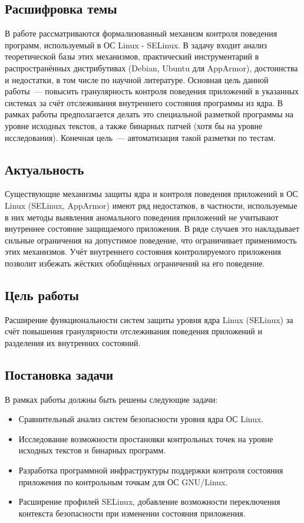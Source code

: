 \subsection{Расшифровка темы}
В работе рассматриваются формализованный 
механизм контроля поведения программ, 
используемый в ОС Linux - SELinux. 
В задачу входит анализ теоретической базы 
этих механизмов, практический инструментарий
в распространённых дистрибутивах (Debian, 
Ubuntu для AppArmor), достоинства и 
недостатки, в том числе по научной 
литературе. Основная цель данной работы~--- 
повысить гранулярность контроля поведения 
приложений в указанных системах за счёт 
отслеживания внутреннего состояния программы 
из ядра. В рамках работы предполагается делать 
это специальной разметкой программы на уровне 
исходных текстов, а также бинарных патчей (хотя 
бы на уровне исследования). Конечная цель~--- 
автоматизация такой разметки по тестам.

\subsection{Актуальность} 
Существующие механизмы защиты ядра и 
контроля поведения приложений в ОС Linux 
(SELinux, AppArmor) имеют ряд недостатков, 
в частности, используемые в них методы 
выявления аномального поведения приложений 
не учитывают внутреннее состояние защищаемого 
приложения. В ряде случаев это накладывает 
сильные ограничения на допустимое поведение, 
что ограничивает применимость этих механизмов. 
Учёт внутреннего состояния контролируемого 
приложения позволит избежать жёстких обобщённых 
ограничений на его поведение.

\subsection{Цель работы} 
Расширение функциональности систем защиты 
уровня ядра Linux (SELinux) за счёт повышения 
гранулярности отслеживания поведения приложений 
и разделения их внутренних состояний.

\subsection{Постановка задачи}
В рамках работы должны быть решены следующие задачи:
\begin{itemize}
\item Сравнительный анализ систем безопасности 
	уровня ядра ОС Linux.
\item Исследование возможности 
	простановки контрольных точек на уровне 
	исходных текстов и бинарных программ.
\item Разработка программной инфраструктуры 
	поддержки контроля состояния приложения 
	по контрольным точкам для ОС GNU/Linux.
\item Расширение профилей SELinux, добавление 
	возможности переключения контекста безопасности 
	при изменении состояния приложения.
\end{itemize}
\bigskip


